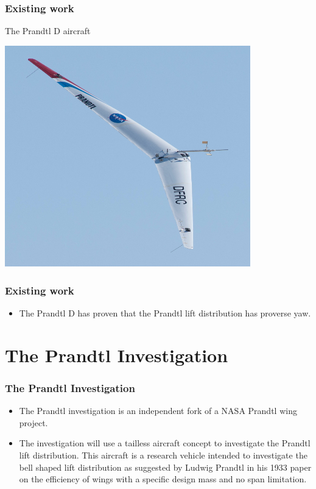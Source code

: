 \documentclass{beamer}
\begin{document}
\begin{frame}
\frametitle{Existing work}

The Prandtl D aircraft

\includegraphics[width = 0.8\textwidth]{Pictures/PrandtlDflight.jpg}


\end{frame}


\begin{frame}
\frametitle{Existing work}
\begin{itemize}
\item The Prandtl D has proven that the Prandtl lift distribution has proverse yaw.
\end{itemize}
\end{frame}


\section{The Prandtl Investigation}

\begin{frame}
\frametitle{The Prandtl Investigation}

\begin{itemize}
\item The Prandtl investigation is an independent fork of a NASA Prandtl wing project.
\item The investigation will use a tailless aircraft concept to investigate the Prandtl lift distribution.  This aircraft is a research vehicle intended to investigate the bell shaped lift distribution as suggested by Ludwig Prandtl in his 1933 paper on the efficiency of wings with a specific design mass and no span limitation.
\end{itemize}

\end{frame}
\end{document}
